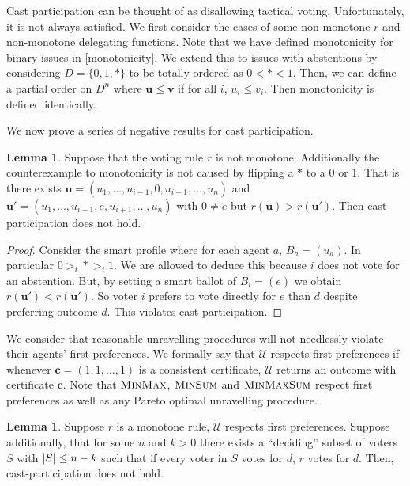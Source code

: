 \documentclass[11pt,a4paper, titlepage]{article}
\DeclarePairedDelimiter\abs{\lvert}{\rvert}
\theoremstyle{definition}
\newtheorem{lemma}[theorem]{Lemma}
\let\vec\mathbf
\begin{document}
Cast participation can be thought of as disallowing tactical voting. Unfortunately, it is not always satisfied. 
We first consider the cases of some non-monotone $r$ and non-monotone delegating functions. 
Note that we have defined monotonicity for binary issues in \cref{monotonicity}. 
We extend this to issues with abstentions by considering $D = \{0, 1, *\}$ to be totally ordered as $0 < * < 1$.
Then, we can define a partial order on $D^n$ where $\vec{u} \leq \vec{v}$ if for all $i$, $u_i \leq v_i$. Then monotonicity is defined identically.

We now prove a series of negative results for cast participation.



\begin{lemma} Suppose that the voting rule $r$ is not monotone. Additionally the counterexample to monotonicity is not caused by flipping a $*$ to a $0$ or $1$. 
That is there exists $\vec{u} = (u_1, \ldots, u_{i-1}, 0, u_{i+1}, \ldots, u_n)$ and $\vec{u}' = (u_1, \ldots, u_{i-1}, e, u_{i+1}, \ldots, u_n)$ with $0 \neq e$ but $r(\vec{u}) > r(\vec{u}')$. 
Then cast participation does not hold.
\end{lemma}

\begin{proof}
    Consider the smart profile where for each agent $a$, $B_a = (u_a)$. 
    In particular $0 >_i * >_i 1$. We are allowed to deduce this because $i$ does not vote for an abstention.
    But, by setting a smart ballot of $B_i = (e)$ we obtain $r(\vec{u}') < r(\vec{u}')$. So voter $i$ prefers to vote directly for $e$ than $d$ despite preferring outcome $d$.
    This violates cast-participation.
\end{proof}

We consider that reasonable unravelling procedures will not needlessly violate their agents' first preferences. 
We formally say that $\mathcal{U}$ respects first preferences if whenever $\vec{c} = (1, 1, \ldots, 1)$ is a consistent certificate, $\mathcal{U}$ returns an outcome with certificate $\vec{c}$. 
Note that $\textsc{MinMax}$, $\textsc{MinSum}$ and $\textsc{MinMaxSum}$ respect first preferences as well as any Pareto optimal unravelling procedure.

\begin{lemma}
    Suppose $r$ is a monotone rule, $\mathcal{U}$ respects first preferences. Suppose additionally, that for some $n$ and $k > 0$ there exists a ``deciding'' subset of voters $S$ with $\abs{S} \leq n - k$ such that if every voter in $S$ votes for $d$, $r$ votes for $d$.
    Then, cast-participation does not hold.
\end{lemma}
\end{document}
